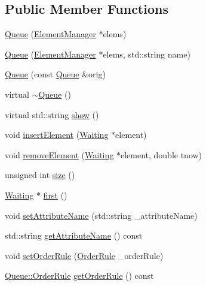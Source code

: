 \subsection*{Public Member Functions}
\begin{DoxyCompactItemize}
\item 
\hyperlink{class_queue_a21aace6957127c66dfcf25c32f05106c}{Queue} (\hyperlink{class_element_manager}{Element\+Manager} $\ast$elems)
\item 
\hyperlink{class_queue_aff61cf134dd95fc7359a8c55a214a7e0}{Queue} (\hyperlink{class_element_manager}{Element\+Manager} $\ast$elems, std\+::string name)
\item 
\hyperlink{class_queue_a09f908d6edb810d86871bda50fdf4bac}{Queue} (const \hyperlink{class_queue}{Queue} \&orig)
\item 
virtual \hyperlink{class_queue_a00d119db8fa3050da37746e82cbcf94f}{$\sim$\+Queue} ()
\item 
virtual std\+::string \hyperlink{class_queue_ac78cc84cd91539c7f38d95dc17dabac5}{show} ()
\item 
void \hyperlink{class_queue_a961b5b7ca80317aa69f958612fb988ad}{insert\+Element} (\hyperlink{class_waiting}{Waiting} $\ast$element)
\item 
void \hyperlink{class_queue_a114d5144b3026b57cca9cf481b1f0d65}{remove\+Element} (\hyperlink{class_waiting}{Waiting} $\ast$element, double tnow)
\item 
unsigned int \hyperlink{class_queue_a4cd92f99b7abc9ec4df32690dc5a037d}{size} ()
\item 
\hyperlink{class_waiting}{Waiting} $\ast$ \hyperlink{class_queue_a39a1f5a1733f61634339ecee7aac7907}{first} ()
\item 
void \hyperlink{class_queue_ac6dfa8e6902a2ef4aebf2b19c33279fd}{set\+Attribute\+Name} (std\+::string \+\_\+attribute\+Name)
\item 
std\+::string \hyperlink{class_queue_adad268232645381606198ea9ac598cb3}{get\+Attribute\+Name} () const 
\item 
void \hyperlink{class_queue_acab2f77f099d40afa971ad5d9d9d9323}{set\+Order\+Rule} (\hyperlink{class_queue_ad95b032373998be7300d630784246aae}{Order\+Rule} \+\_\+order\+Rule)
\item 
\hyperlink{class_queue_ad95b032373998be7300d630784246aae}{Queue\+::\+Order\+Rule} \hyperlink{class_queue_af66acbad0c1272ea67255425cd9d5a37}{get\+Order\+Rule} () const 
\end{DoxyCompactItemize}
